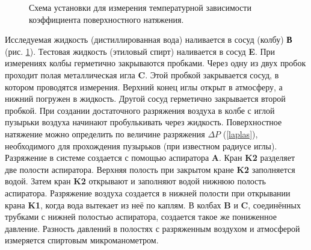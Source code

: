\documentclass[a4paper, 12pt]{article}
\begin{document}
\begin{figure}[H] 
    \caption{Схема установки для измерения температурной зависимости коэффициента поверхностного натяжения.}
    \label{ris:ustanovka}
\end{figure}

Исследуемая жидкость (дистиллированная вода) наливается в сосуд (колбу) \textbf{В} (рис. \ref{ris:ustanovka}). Тестовая жидкость  (этиловый спирт) наливается  в сосуд \textbf{E}. При измерениях  колбы герметично закрываются  пробками.   Через одну из двух пробок  проходит полая металлическая игла \textbf{C}. Этой пробкой закрывается сосуд, в котором  проводятся измерения. Верхний конец иглы открыт в атмосферу, а нижний погружен в жидкость. Другой сосуд герметично закрывается второй пробкой. При создании достаточного  разряжения воздуха в колбе с иглой пузырьки воздуха начинают пробулькивать через жидкость. Поверхностное натяжение можно определить по величине разряжения $\Delta P$ (\ref{laplas}), необходимого для прохождения пузырьков (при известном радиусе иглы).\\
Разряжение в системе создается с помощью аспиратора \textbf{A}. Кран \textbf{K2} разделяет две полости аспиратора. Верхняя полость при закрытом кране \textbf{K2}  заполняется водой. Затем кран \textbf{K2} открывают и заполняют водой  нижнюю полость  аспиратора.  Разряжение воздуха создается в нижней полости  при открывании крана \textbf{K1}, когда  вода вытекает из неё по каплям. В колбах \textbf{B} и \textbf{C}, соединённых трубками с нижней полостью аспиратора,  создается такое же пониженное давление. Разность давлений в полостях с разряженным воздухом и атмосферой измеряется спиртовым микроманометром.
\end{document}
